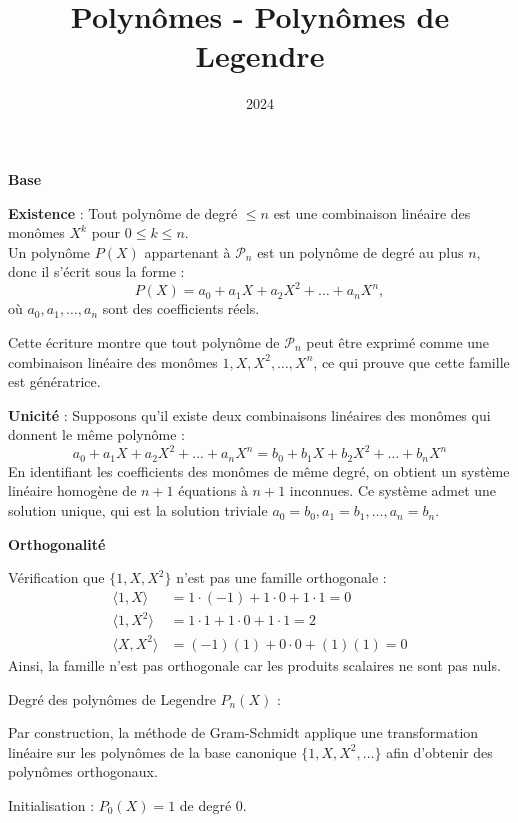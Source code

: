 \documentclass[10pt,a4paper]{article}
\title{Polynômes - Polynômes de Legendre}
\author{}
\date{2024}
\begin{document}
\bigskip
\textbf{Base}

\q \textbf{Existence} : Tout polynôme de degré $\leq n$ est une combinaison linéaire des monômes
$X^k$ pour $0 \leq k \leq n$.\\
Un polynôme \( P(X) \) appartenant à \( \mathcal{P}_n \) est un polynôme de degré au plus
\( n \), donc il s'écrit sous la forme :
\[
P(X) = a_0 + a_1 X + a_2 X^2 + \dots + a_n X^n,
\]
où \( a_0, a_1, \dots, a_n \) sont des coefficients réels.

Cette écriture  montre que tout polynôme de \( \mathcal{P}_n \) peut être exprimé comme une
combinaison linéaire des monômes \( 1, X, X^2, \dots, X^n \), ce qui prouve que cette famille est
génératrice.

\textbf{Unicité} : Supposons qu'il existe deux combinaisons linéaires des monômes qui donnent le
même polynôme :
\[
a_0 + a_1 X + a_2 X^2 + \dots + a_n X^n = b_0 + b_1 X + b_2 X^2 + \dots + b_n X^n
\]
En identifiant les coefficients des monômes de même degré, on obtient un système linéaire homogène
de \( n+1 \) équations à \( n+1 \) inconnues. Ce système admet une solution unique, qui est la
solution triviale \( a_0 = b_0, a_1 = b_1, \dots, a_n = b_n \).


\bigskip
\textbf{Orthogonalité}

\q Vérification que $\{1, X, X^2\}$ n'est pas une famille orthogonale :
\begin{align*}
\langle 1, X \rangle &= 1 \cdot (-1) + 1 \cdot 0 + 1 \cdot 1 = 0 \\
\langle 1, X^2 \rangle &= 1 \cdot 1 + 1 \cdot 0 + 1 \cdot 1 = 2 \\
\langle X, X^2 \rangle &= (-1)(1) + 0 \cdot 0 + (1)(1) = 0
\end{align*}
Ainsi, la famille n'est pas orthogonale car les produits scalaires ne sont pas nuls.

\q Degré des polynômes de Legendre \( P_n(X) \) :

Par construction, la méthode de Gram-Schmidt applique une transformation linéaire sur les polynômes
de la base canonique \( \{1, X, X^2, \dots\} \) afin d'obtenir des polynômes orthogonaux.

Initialisation : $P_0(X) = 1$ de degré 0.
\end{document}
